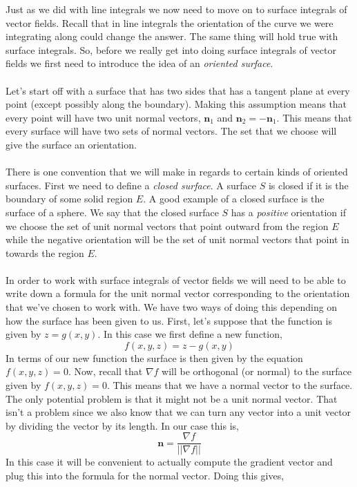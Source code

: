 \documentclass[10pt,reqno]{book}
\theoremstyle{definition}
\renewcommand{\vec}[1]{\mathbf{#1}}
\begin{document}
	Just as we did with line integrals we now need to move on to surface integrals of vector fields. Recall that in line integrals the orientation of the curve we were integrating along could change the answer. The same thing will hold true with surface integrals. So, before we really get into doing surface integrals of vector fields we first need to introduce the idea of an \textit{oriented surface}.\\ \\
	Let's start off with a surface that has two sides that has a tangent plane at every point (except possibly along the boundary). Making this assumption means that every point will have two unit normal vectors, $ \vec{n}_1 $ and $ \vec{n}_2 = -\vec{n}_1 $. This means that every surface will have two sets of normal vectors. The set that we choose will give the surface an orientation. \\ \\
	There is one convention that we will make in regards to certain kinds of oriented surfaces. First we need to define a \textit{closed surface}. A surface $ S $ is closed if it is the boundary of some solid region $ E $. A good example of a closed surface is the surface of a sphere. We say that the closed surface $ S $ has a \textit{positive} orientation if we choose the set of unit normal vectors that point outward from the region $ E $ while the negative orientation will be the set of unit normal vectors that point in towards the region $ E $.\\ \\
	In order to work with surface integrals of vector fields we will need to be able to write down a formula for the unit normal vector corresponding to the orientation that we've chosen to work with.  We have two ways of doing this depending on how the surface has been given to us. First, let's suppose that the function is given by $ z = g(x,y) $. In this case we first define a new function,
	\[ f(x,y,z) = z - g(x,y) \]
	In terms of our new function the surface is then given by the equation $ f(x,y,z) = 0 $.  Now, recall that $ \nabla f $ will be orthogonal (or normal) to the surface given by $ f(x,y,z) = 0 $. This means that we have a normal vector to the surface. The only potential problem is that it might not be a unit normal vector. That isn't a problem since we also know that we can turn any vector into a unit vector by dividing the vector by its length. In our case this is,
	\[ \vec{n} = \frac{\nabla f}{|| \nabla f ||} \]
	In this case it will be convenient to actually compute the gradient vector and plug this into the formula for the normal vector.  Doing this gives,
\end{document}

